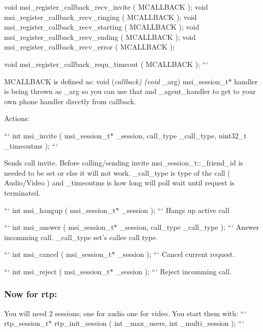 void msi\+\_\+register\+\_\+callback\+\_\+recv\+\_\+invite ( M\+C\+A\+L\+L\+B\+A\+C\+K ); void msi\+\_\+register\+\_\+callback\+\_\+recv\+\_\+ringing ( M\+C\+A\+L\+L\+B\+A\+C\+K ); void msi\+\_\+register\+\_\+callback\+\_\+recv\+\_\+starting ( M\+C\+A\+L\+L\+B\+A\+C\+K ); void msi\+\_\+register\+\_\+callback\+\_\+recv\+\_\+ending ( M\+C\+A\+L\+L\+B\+A\+C\+K ); void msi\+\_\+register\+\_\+callback\+\_\+recv\+\_\+error ( M\+C\+A\+L\+L\+B\+A\+C\+K );

void msi\+\_\+register\+\_\+callback\+\_\+requ\+\_\+timeout ( M\+C\+A\+L\+L\+B\+A\+C\+K ); ```

M\+C\+A\+L\+L\+B\+A\+C\+K is defined as\+: void ({\itshape callback) (void} \+\_\+arg) msi\+\_\+session\+\_\+t$\ast$ handler is being thrown as \+\_\+arg so you can use that and \+\_\+agent\+\_\+handler to get to your own phone handler directly from callback.

Actions\+:

``` int msi\+\_\+invite ( msi\+\_\+session\+\_\+t$\ast$ \+\_\+session, call\+\_\+type \+\_\+call\+\_\+type, uint32\+\_\+t \+\_\+timeoutms ); ```

Sends call invite. Before calling/sending invite msi\+\_\+session\+\_\+t\+::\+\_\+friend\+\_\+id is needed to be set or else it will not work. \+\_\+call\+\_\+type is type of the call ( Audio/\+Video ) and \+\_\+timeoutms is how long will poll wait until request is terminated.

``` int msi\+\_\+hangup ( msi\+\_\+session\+\_\+t$\ast$ \+\_\+session ); ``` Hangs up active call

``` int msi\+\_\+answer ( msi\+\_\+session\+\_\+t$\ast$ \+\_\+session, call\+\_\+type \+\_\+call\+\_\+type ); ``` Answer incomming call. \+\_\+call\+\_\+type set's callee call type.

``` int msi\+\_\+cancel ( msi\+\_\+session\+\_\+t$\ast$ \+\_\+session ); ``` Cancel current request.

``` int msi\+\_\+reject ( msi\+\_\+session\+\_\+t$\ast$ \+\_\+session ); ``` Reject incomming call.

\subsubsection*{Now for rtp\+:}

You will need 2 sessions; one for audio one for video. You start them with\+: ``` rtp\+\_\+session\+\_\+t$\ast$ rtp\+\_\+init\+\_\+session ( int \+\_\+max\+\_\+users, int \+\_\+multi\+\_\+session ); ```

